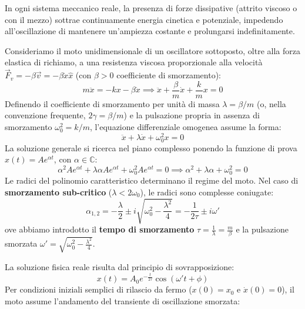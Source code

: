 In ogni sistema meccanico reale, la presenza di forze dissipative (attrito viscoso o con il mezzo) sottrae continuamente energia cinetica e potenziale, impedendo all'oscillazione di mantenere un'ampiezza costante e prolungarsi indefinitamente.

Consideriamo il moto unidimensionale di un oscillatore sottoposto, oltre alla forza elastica di richiamo, a una resistenza viscosa proporzionale alla velocità $\vec{F}_v = -\beta\vec{v} = -\beta\dot{x}\hat{x}$ (con $\beta > 0$ coefficiente di smorzamento):
\begin{equation}
    m\ddot{x} = -kx - \beta\dot{x} \implies \ddot{x} + \frac{\beta}{m}\dot{x} + \frac{k}{m}x = 0
\end{equation}
Definendo il coefficiente di smorzamento per unità di massa $\lambda = \beta/m$ (o, nella convenzione frequente, $2\gamma = \beta/m$) e la pulsazione propria in assenza di smorzamento $\omega_0^2 = k/m$, l'equazione differenziale omogenea assume la forma:
\begin{equation}
    \ddot{x} + \lambda\dot{x} + \omega_0^2 x = 0
\end{equation}
La soluzione generale si ricerca nel piano complesso ponendo la funzione di prova $x(t) = A e^{\alpha t}$, con $\alpha \in \mathbb{C}$:
\begin{equation}
    \alpha^2 A e^{\alpha t} + \lambda\alpha A e^{\alpha t} + \omega_0^2 A e^{\alpha t} = 0 \implies \alpha^2 + \lambda\alpha + \omega_0^2 = 0
\end{equation}
Le radici del polinomio caratteristico determinano il regime del moto. Nel caso di \textbf{smorzamento sub-critico} ($\lambda < 2\omega_0$), le radici sono complesse coniugate:
\begin{equation}
    \alpha_{1,2} = -\frac{\lambda}{2} \pm i\sqrt{\omega_0^2 - \frac{\lambda^2}{4}} = -\frac{1}{2\tau} \pm i\omega'
\end{equation}
ove abbiamo introdotto il \textbf{tempo di smorzamento} $\tau = \frac{1}{\lambda} = \frac{m}{\beta}$ e la pulsazione smorzata $\omega' = \sqrt{\omega_0^2 - \frac{\lambda^2}{4}}$.

La soluzione fisica reale risulta dal principio di sovrapposizione:
\begin{equation}
    x(t) = A_0 e^{-\frac{t}{2\tau}} \cos(\omega' t + \phi)
\end{equation}
Per condizioni iniziali semplici di rilascio da fermo ($x(0) = x_0$ e $\dot{x}(0) = 0$), il moto assume l'andamento del transiente di oscillazione smorzata:

